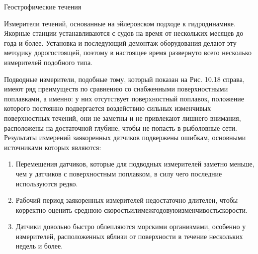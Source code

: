 \begin{chapter}{Геострофические течения}
\begin{section}{Измерители течений, основанные на эйлеровском подходе 
к гидродинамике.}
Якорные станции устанавливаются с судов на время от нескольких месяцев
до года и более. Установка и последующий демонтаж оборудования делают
эту методику дорогостоящей, поэтому в настоящее время развернуто всего
несколько измерителей подобного типа.

Подводные измерители, подобные тому, который показан на Рис. 10.18
справа, имеют ряд преимуществ по сравнению со снабженными
поверхностными поплавками, а именно: у них отсутствует поверхностный
поплавок, положение которого постоянно подвергается воздействию
сильных изменчивых поверхностных течений, они не заметны и не
привлекают лишнего внимания, расположены на достаточной глубине, чтобы
не попасть в рыболовные сети. Результаты измерений заякоренных
датчиков подвержены ошибкам, основными источниками которых являются:
%
\begin{enumerate}
\item
Перемещения датчиков, которые для подводных измерителей заметно
меньше, чем у датчиков с поверхностным поплавком, в силу чего
последние используются редко.
%

\item
Рабочий период заякоренных измерителей недостаточно длителен, чтобы
корректно оценить среднюю скоростьилимежгодовуюизменчивостьскорости.
%

\item
Датчики довольно быстро облепляются морскими организмами, особенно у
измерителей, расположенных вблизи от поверхности в течение нескольких
недель и более.
%
\end{enumerate}


\end{section}
\end{chapter}
